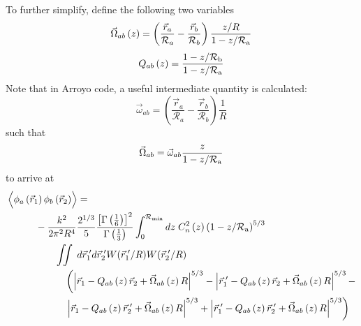 To further simplify, define the following two variables
\begin{equation}\label{eqn:Omega}
\vec{\Omega}_{ab}\left(z\right) = 
\left(\frac{\vec{r}_{a}}{\mathcal{R}_{a}} - \frac{\vec{r}_{b}}{\mathcal{R}_{b}} \right) \frac{z/R}{1-z/\mathcal{R}_{\rm a}}
\end{equation}
\begin{equation}\label{eqn:Q}
Q_{ab}\left(z\right) =  
\frac{1 - z/\mathcal{R}_{\rm b}}{1-z/\mathcal{R}_{\rm a}}
\end{equation}
Note that in Arroyo code, a useful intermediate quantity is
calculated:
\begin{equation}\label{eqn:little_omega}
\vec{\omega}_{ab} = \left(\frac{\vec{r}_{a}}{\mathcal{R}_{a}} - \frac{\vec{r}_{b}}{\mathcal{R}_{b}} \right) \frac{1}{R}
\end{equation}
such that 
\begin{equation}
\vec{\Omega}_{ab} = \vec{\omega}_{ab} \frac{z}{1-z/\mathcal{R}_{\rm a}}
\end{equation}
to arrive at
\begin{equation}\label{eqn:prphase_n6}
\begin{aligned}
&\left\langle \vphantom{\hat{\phi}_{a}} \phi_{a}\left(\vec{r}_{1}\right) \phi_{b}\left(\vec{r}_{2}\right)\right\rangle = \quad \quad \quad\\
&\quad\quad\quad
-\frac{k^{2}}{2\pi^{2}R^{4}} 
\frac{2^{1/3}}{5}\frac{\left[\Gamma\left(\frac{1}{6}\right)\right]^{2}}{\Gamma\left(\frac{1}{3}\right)} 
\int_{0}^{\mathcal{R}_{\rm min}} dz\;C_{n}^{2}\left(z\right) 
\left(1 - z/\mathcal{R}_{\rm a}\right)^{5/3}\\
&\quad\quad\quad\quad\quad
\iint \; d\vec{r}^{\;\prime}_{1}d\vec{r}^{\;\prime}_{2}  
W(\vec{r}^{\;\prime}_{1}/R) W(\vec{r}^{\;\prime}_{2}/R) \\
&\quad\quad\quad\quad\quad\quad
\left(\left\vert \vec{r}_{1}  - Q_{ab}\left(z\right)\vec{r}_{2} + \vec{\Omega}_{ab}\left(z\right)R\right\vert^{5/3} -
\left\vert \vec{r}^{\;\prime}_{1}  - Q_{ab}\left(z\right)\vec{r}_{2} + \vec{\Omega}_{ab}\left(z\right)R\right\vert^{5/3} -
\right. \\
& \quad\quad\quad\quad\quad\quad
\left.
\left\vert \vec{r}_{1}  - Q_{ab}\left(z\right)\vec{r}^{\;\prime}_{2} + \vec{\Omega}_{ab}\left(z\right)R\right\vert^{5/3} + 
\left\vert \vec{r}^{\;\prime}_{1}  - Q_{ab}\left(z\right)\vec{r}^{\;\prime}_{2} + \vec{\Omega}_{ab}\left(z\right)R\right\vert^{5/3}\right)
\end{aligned}
\end{equation}

